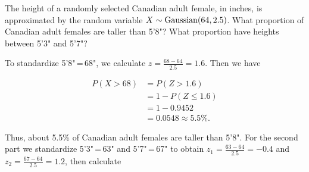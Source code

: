 \begin{example}\label{FemaleHeightsGaussian} The height of a randomly selected Canadian adult female, in inches, is approximated by the random variable $X \sim \operatorname{Gaussian}(64,2.5)$. What proportion of Canadian adult females are taller than 5'8"? What proportion have heights between 5'3" and 5'7"?

To standardize 5'8"\,=\,68", we calculate $z = \frac{68 - 64}{2.5} = 1.6$. Then we have
\
\begin{center}
    \begin{minipage}{0.5\textwidth}
        \centering
  $$\begin{aligned}P(X > 68) &= P(Z > 1.6) \\ &= 1 - P(Z \leq 1.6) \\ &= 1 - 0.9452 \\ &= 0.0548 \approx 5.5\%.\end{aligned}$$
  \vspace{1.25em}
    \end{minipage}\begin{minipage}{0.5\textwidth}
        \centering
\end{minipage}
\end{center}

Thus, about 5.5\% of Canadian adult females are taller than 5'8". For the second part we standardize 5'3"\,=\,63" and 5'7"\,=\,67" to obtain $z_1 = \frac{63-64}{2.5} = -0.4$ and $z_2 = \frac{67-64}{2.5} = 1.2$, then calculate


\end{example}
